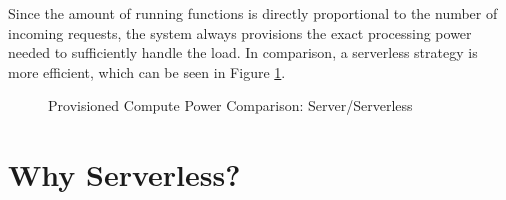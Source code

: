 Since the amount of running functions is directly proportional to the number of incoming requests, the system always provisions the exact processing power needed to sufficiently handle the load. In comparison, a serverless strategy is more efficient, which can be seen in Figure \ref{graph:provisionedComputePowerComparison}.

\begin{figure}[ht]
    \centering
    \caption {Provisioned Compute Power Comparison: Server/Serverless}
    \label{graph:provisionedComputePowerComparison}
\end{figure}



\section{Why Serverless?}


